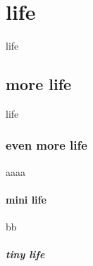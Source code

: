 \documentclass{iyte}    %
\begin{document}
\section{life}
life

\subsection{more life}
life

\subsubsection{even more life}
aaaa

\paragraph{mini life}
bb

\subparagraph{tiny life}


%
%
\end{document}
